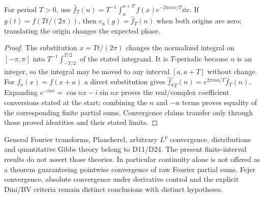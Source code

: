\begin{proposition}
For period $T>0$, use
$\widehat f_T(n)=T^{-1}\int_{a}^{a+T}f(x)e^{-2\pi inx/T}\dd x$.
If $g(t)=f(Tt/(2\pi))$, then $c_n(g)=\widehat f_T(n)$ when both
origins are zero; translating the origin changes the expected phase.
\end{proposition}
\begin{proof}
The substitution $x=Tt/(2\pi)$ changes the normalized integral on
$[-\pi,\pi]$ into $T^{-1}\int_{-T/2}^{T/2}$ of the stated integrand.
It is $T$-periodic because $n$ is an integer, so the integral may be moved
to any interval $[a,a+T]$ without change. For $f_a(x)=f(x+a)$ a direct
substitution gives $\widehat{f_a}_T(n)=e^{2\pi ina/T}\widehat f_T(n)$.
Expanding $e^{-inx}=\cos nx-i\sin nx$ proves the real/complex
coefficient conversions stated at the start; combining the $n$ and $-n$
terms proves equality of the corresponding finite partial sums. Convergence
claims transfer only through those proved identities and their stated limits.
\end{proof}

\begin{remark}
General Fourier transforms, Plancherel, arbitrary $L^p$ convergence,
distributions and quantitative Gibbs theory belong to D11/D24.
The present finite-interval results do not assert those theories.
In particular continuity alone is not offered as a theorem guaranteeing
pointwise convergence of raw Fourier partial sums. Fejer convergence,
absolute convergence under derivative control and the explicit Dini/BV
criteria remain distinct conclusions with distinct hypotheses.
\end{remark}
